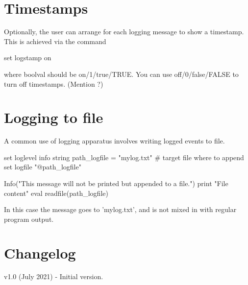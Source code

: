 \documentclass{article}
\begin{document}
\section{Timestamps}

Optionally, the user can arrange for each logging message to show a
timestamp. This is achieved via the command
\begin{code}
set logstamp on
\end{code}
where boolval should be on/1/true/TRUE. You can use off/0/false/FALSE
to turn off timestamps. (Mention ?)

\section{Logging to file}

A common use of logging apparatus involves writing logged events to file.
\begin{code}
  set loglevel info
  string path_logfile = "mylog.txt" # target file where to append
  set logfile "@path_logfile"

  Info("This message will not be printed but appended to a file.")
  print "File content"
  eval readfile(path_logfile)
\end{code}
In this case the message goes to 'mylog.txt', and is not mixed in with
regular program output.

\section{Changelog}

v1.0 (July 2021)
- Initial version.
\end{document}
